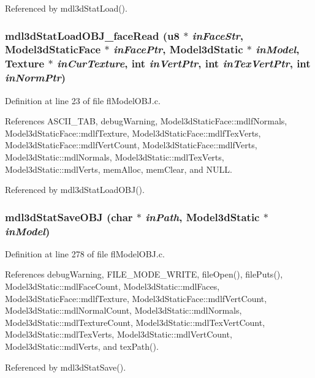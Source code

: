 Referenced by mdl3d\-Stat\-Load().
\subsubsection{ mdl3d\-Stat\-Load\-OBJ\_\-face\-Read (u8 $\ast$ {\em in\-Face\-Str}, {\bf Model3d\-Static\-Face} $\ast$ {\em in\-Face\-Ptr}, {\bf Model3d\-Static} $\ast$ {\em in\-Model}, {\bf Texture} $\ast$ {\em in\-Cur\-Texture}, int {\em in\-Vert\-Ptr}, int {\em in\-Tex\-Vert\-Ptr}, int {\em in\-Norm\-Ptr})}\label{flModelOBJ_8c_c84f7bf28b588c2f72641167b1b2ae0a}




Definition at line 23 of file fl\-Model\-OBJ.c.

References ASCII\_\-TAB, debug\-Warning, Model3d\-Static\-Face::mdlf\-Normals, Model3d\-Static\-Face::mdlf\-Texture, Model3d\-Static\-Face::mdlf\-Tex\-Verts, Model3d\-Static\-Face::mdlf\-Vert\-Count, Model3d\-Static\-Face::mdlf\-Verts, Model3d\-Static::mdl\-Normals, Model3d\-Static::mdl\-Tex\-Verts, Model3d\-Static::mdl\-Verts, mem\-Alloc, mem\-Clear, and NULL.

Referenced by mdl3d\-Stat\-Load\-OBJ().
\subsubsection{ mdl3d\-Stat\-Save\-OBJ (char $\ast$ {\em in\-Path}, {\bf Model3d\-Static} $\ast$ {\em in\-Model})}\label{flModelOBJ_8c_66f3001e424356a60083f21c3d39f4c1}




Definition at line 278 of file fl\-Model\-OBJ.c.

References debug\-Warning, FILE\_\-MODE\_\-WRITE, file\-Open(), file\-Puts(), Model3d\-Static::mdl\-Face\-Count, Model3d\-Static::mdl\-Faces, Model3d\-Static\-Face::mdlf\-Texture, Model3d\-Static\-Face::mdlf\-Vert\-Count, Model3d\-Static::mdl\-Normal\-Count, Model3d\-Static::mdl\-Normals, Model3d\-Static::mdl\-Texture\-Count, Model3d\-Static::mdl\-Tex\-Vert\-Count, Model3d\-Static::mdl\-Tex\-Verts, Model3d\-Static::mdl\-Vert\-Count, Model3d\-Static::mdl\-Verts, and tex\-Path().

Referenced by mdl3d\-Stat\-Save().